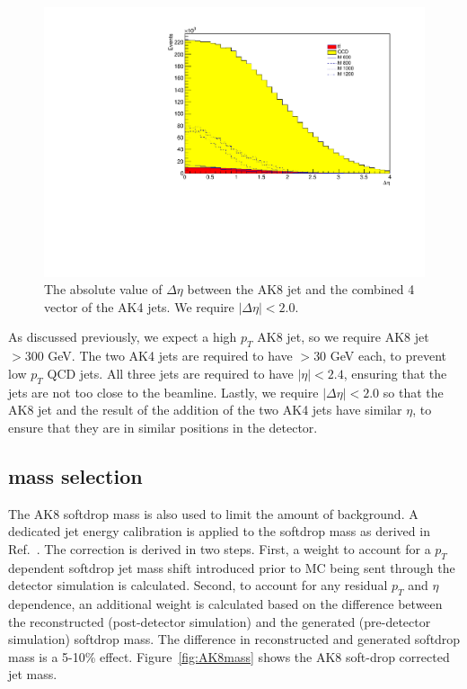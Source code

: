 \begin{figure}[thb!]
\begin{center}
\includegraphics[scale=0.34]{F5/shapedeta.pdf}
\end{center}
\caption{The absolute value of $\Delta\eta$ between the AK8 jet and the combined 4 vector of the AK4 jets. We require $|\Delta\eta| < 2.0$.}
\label{fig:deta}
\end{figure} 

As discussed previously, we expect a high $p_{T}$ AK8 jet, so we require AK8 jet $> 300$ GeV. The two AK4 jets are required to have $> 30$ GeV each, to prevent low $p_{T}$ QCD jets. All three jets are required to have $|\eta| < 2.4$, ensuring that the jets are not too close to the beamline. Lastly, we require $|\Delta\eta| < 2.0$ so that the AK8 jet and the result of the addition of the two AK4 jets have similar $\eta$, to ensure that they are in similar positions in the detector.

\subsection{\texorpdfstring{\PH}{H} mass selection\label{ss:EvtSelMass}}

The AK8 softdrop mass is also used to limit the amount of background. A dedicated jet energy calibration is applied to the softdrop mass as derived in Ref.~\cite{CMS-AN-16-235}. The correction is derived in two steps. First, a weight to account for a $p_{T}$ dependent softdrop jet mass shift introduced prior to MC being sent through the detector simulation is calculated. Second, to account for any residual $p_{T}$ and $\eta$ dependence, an additional weight is calculated based on the difference between the reconstructed (post-detector simulation) and the generated (pre-detector simulation) softdrop mass. The difference in reconstructed and generated softdrop mass is a 5-10\% effect. 
Figure~\ref{fig:AK8mass} shows the AK8 soft-drop corrected jet mass. 

